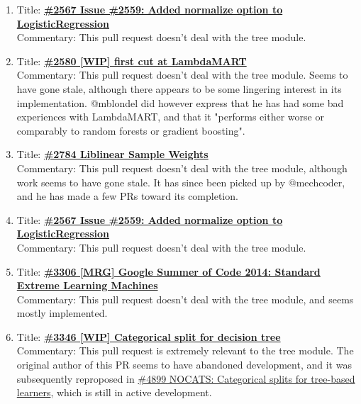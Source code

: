 \documentclass[12pt, oneside]{article}
\begin{document}
\begin{enumerate}
  \item 
  Title:
  \textbf{\href{https://github.com/scikit-learn/scikit-learn/pull/2567}
    {\#2567 Issue \#2559: Added normalize option to LogisticRegression}}\\
  Commentary: This pull request doesn't deal with the tree module.

  \item 
  Title:
  \textbf{\href{https://github.com/scikit-learn/scikit-learn/pull/2580}
    {\#2580 [WIP] first cut at LambdaMART}}\\
  Commentary: This pull request doesn't deal with the tree
  module. Seems to have gone stale, although there appears to be some
  lingering interest in its implementation. @mblondel did however
  express that he has had some bad experiences with LambdaMART, and
  that it "performs either worse or comparably to random forests or
  gradient boosting".


  \item 
  Title:
  \textbf{\href{https://github.com/scikit-learn/scikit-learn/pull/2784}
    {\#2784 Liblinear Sample Weights}}\\
  Commentary: This pull request doesn't deal with the tree module,
  although work seems to have gone stale. It has since been picked up
  by @mechcoder, and he has made a few PRs toward its completion.


  \item 
  Title:
  \textbf{\href{https://github.com/scikit-learn/scikit-learn/pull/2567}
    {\#2567 Issue \#2559: Added normalize option to LogisticRegression}}\\
  Commentary: This pull request doesn't deal with the tree module.

  
  \item 
  Title:
  \textbf{\href{https://github.com/scikit-learn/scikit-learn/pull/3306}
    {\#3306 [MRG] Google Summer of Code 2014: Standard Extreme Learning Machines}}\\
  Commentary: This pull request doesn't deal with the tree module, and
  seems mostly implemented.


  \item 
  Title:
  \textbf{\href{https://github.com/scikit-learn/scikit-learn/pull/3346}
    {\#3346 [WIP] Categorical split for decision tree}}\\
  Commentary: This pull request is extremely relevant to the tree
  module. The original author of this PR seems to have abandoned
  development, and it was subsequently reproposed in
  \href{https://github.com/scikit-learn/scikit-learn/pull/4899}{\#4899
    NOCATS: Categorical splits for tree-based learners}, which is
  still in active development.


\end{enumerate}
\end{document}
